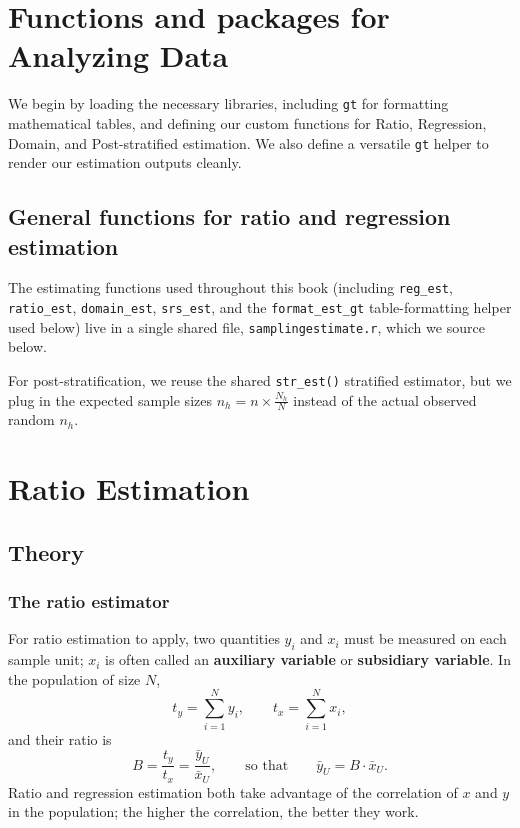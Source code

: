 \documentclass[
  letterpaper,
  DIV=11,
  numbers=noendperiod]{scrreprt}
\renewcommand{\[}{\begin{equation}}
\renewcommand{\]}{\end{equation}}
\begin{document}
\section{Functions and packages for Analyzing
Data}\label{functions-and-packages-for-analyzing-data}

We begin by loading the necessary libraries, including \texttt{gt} for
formatting mathematical tables, and defining our custom functions for
Ratio, Regression, Domain, and Post-stratified estimation. We also
define a versatile \texttt{gt} helper to render our estimation outputs
cleanly.

\subsection{General functions for ratio and regression
estimation}\label{general-functions-for-ratio-and-regression-estimation}

The estimating functions used throughout this book (including
\texttt{reg\_est}, \texttt{ratio\_est}, \texttt{domain\_est},
\texttt{srs\_est}, and the \texttt{format\_est\_gt} table-formatting
helper used below) live in a single shared file,
\texttt{samplingestimate.r}, which we source below.

For post-stratification, we reuse the shared \texttt{str\_est()}
stratified estimator, but we plug in the expected sample sizes
\(n_h = n \times \frac{N_h}{N}\) instead of the actual observed random
\(n_h\).

\section{Ratio Estimation}\label{ratio-estimation}

\subsection{Theory}\label{sec-ratio-theory}

\subsubsection{The ratio estimator}\label{the-ratio-estimator}

For ratio estimation to apply, two quantities \(y_i\) and \(x_i\) must
be measured on each sample unit; \(x_i\) is often called an
\textbf{auxiliary variable} or \textbf{subsidiary variable}. In the
population of size \(N\), \[
t_y = \sum_{i=1}^N y_i, \qquad t_x = \sum_{i=1}^N x_i,
\] and their ratio is \[
B = \frac{t_y}{t_x} = \frac{\bar y_U}{\bar x_U}, \qquad \text{so that} \qquad \bar y_U = B\cdot\bar x_U .
\] Ratio and regression estimation both take advantage of the
correlation of \(x\) and \(y\) in the population; the higher the
correlation, the better they work.
\end{document}
